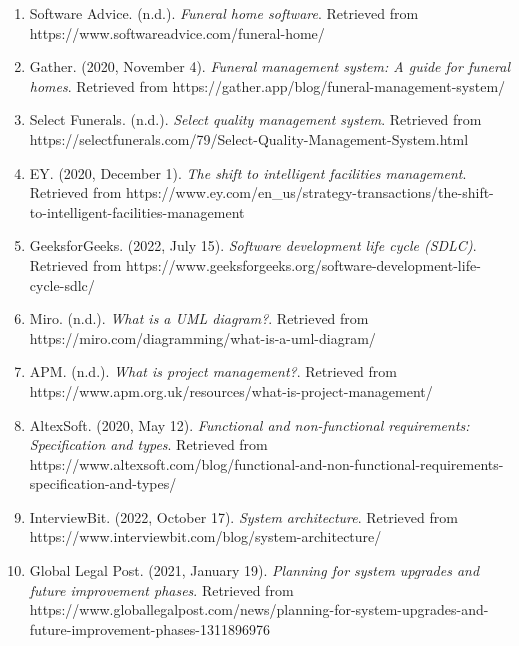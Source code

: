 \documentclass[a4paper,12pt]{report}
\begin{document}
\begin{enumerate}
    \item Software Advice. (n.d.). \textit{Funeral home software}. Retrieved from https://www.softwareadvice.com/funeral-home/
    
    \item Gather. (2020, November 4). \textit{Funeral management system: A guide for funeral homes}. Retrieved from https://gather.app/blog/funeral-management-system/
    
    \item Select Funerals. (n.d.). \textit{Select quality management system}. Retrieved from https://selectfunerals.com/79/Select-Quality-Management-System.html
    
    \item EY. (2020, December 1). \textit{The shift to intelligent facilities management}. Retrieved from https://www.ey.com/en_us/strategy-transactions/the-shift-to-intelligent-facilities-management
    
    \item GeeksforGeeks. (2022, July 15). \textit{Software development life cycle (SDLC)}. Retrieved from https://www.geeksforgeeks.org/software-development-life-cycle-sdlc/
    
    \item Miro. (n.d.). \textit{What is a UML diagram?}. Retrieved from https://miro.com/diagramming/what-is-a-uml-diagram/
    
    \item APM. (n.d.). \textit{What is project management?}. Retrieved from https://www.apm.org.uk/resources/what-is-project-management/
    
    \item AltexSoft. (2020, May 12). \textit{Functional and non-functional requirements: Specification and types}. Retrieved from https://www.altexsoft.com/blog/functional-and-non-functional-requirements-specification-and-types/
    
    \item InterviewBit. (2022, October 17). \textit{System architecture}. Retrieved from https://www.interviewbit.com/blog/system-architecture/
    
    \item Global Legal Post. (2021, January 19). \textit{Planning for system upgrades and future improvement phases}. Retrieved from https://www.globallegalpost.com/news/planning-for-system-upgrades-and-future-improvement-phases-1311896976
\end{enumerate}
\end{document}
